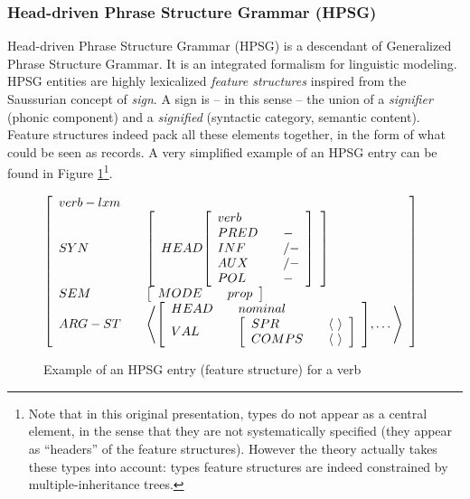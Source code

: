 \documentclass[11pt]{article}
\newenvironment{recenv}
{\left[\begin{array}{lll}}
{\end{array}\right]}
\begin{document}
			\subsubsection{Head-driven Phrase Structure Grammar (HPSG)}
				Head-driven Phrase Structure Grammar (HPSG) \cite{sag2003} is a descendant of Generalized Phrase Structure Grammar. It is an integrated formalism for linguistic modeling. HPSG entities are highly lexicalized \textit{feature structures} inspired from the Saussurian concept of \textit{sign}. A sign is -- in this sense -- the union of a \textit{signifier} (phonic component) and a \textit{signified} (syntactic category, semantic content). Feature structures indeed pack all these elements together, in the form of what could be seen as records. A very simplified example of an HPSG entry can be found in Figure \ref{fig:hpsg_verb_entry}\footnote{Note that in this original presentation, types do not appear as a central element, in the sense that they are not systematically specified (they appear as ``headers'' of the feature structures). However the theory actually takes these types into account: types feature structures are indeed constrained by multiple-inheritance trees.}.\\
				\begin{figure}[h]
					\centering
					$\begin{recenv}
						verb-lxm && \\
						SYN && \begin{recenv}
									HEAD
									\begin{recenv}
										verb && \\
										PRED && -\\
										INF && /-\\
										AUX && /-\\
										POL && -\\
									\end{recenv}
								\end{recenv}\\
						SEM && \begin{recenv}
							MODE && prop\\
								\end{recenv}\\
						ARG-ST && \left \langle
							\begin{recenv}
								HEAD && nominal \\VAL && \begin{recenv}
									SPR && \langle \ \rangle \\C
									OMPS && \langle  \ \rangle
								\end{recenv}
							\end{recenv}, \dots
						 \right \rangle
					\end{recenv}$
					\caption{Example of an HPSG entry (feature structure) for a verb \cite{sag2003}}
					\label{fig:hpsg_verb_entry}
				\end{figure}
				
\end{document}
